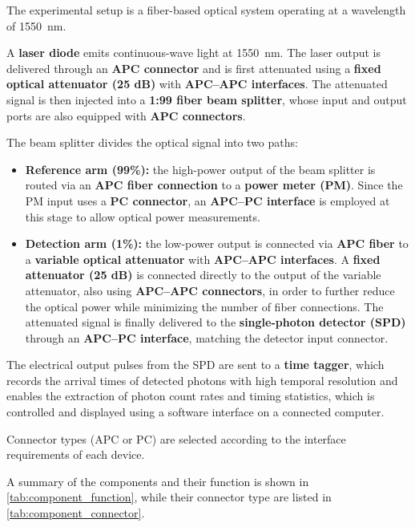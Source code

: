 The experimental setup is a fiber-based optical system operating at a
wavelength of \SI{1550}{\nano\meter}.

A \textbf{laser diode} emits continuous-wave light at
\SI{1550}{\nano\meter}. The laser output is delivered through an
\textbf{APC connector} and is first attenuated using a \textbf{fixed
optical attenuator (25 dB)} with \textbf{APC--APC interfaces}. The
attenuated signal is then injected into a \textbf{1:99 fiber beam
splitter}, whose input and output ports are also equipped with
\textbf{APC connectors}.

The beam splitter divides the optical signal into two paths:
\begin{itemize}
  \item \textbf{Reference arm (99\%):} the high-power output of the
    beam splitter is routed via an \textbf{APC fiber connection} to a
    \textbf{power meter (PM)}. Since the PM input uses a \textbf{PC
    connector}, an \textbf{APC--PC interface} is employed at this
    stage to allow optical power measurements.
  \item \textbf{Detection arm (1\%):} the low-power output is
    connected via \textbf{APC fiber} to a \textbf{variable optical
    attenuator} with \textbf{APC--APC interfaces}. A \textbf{fixed
    attenuator (25 dB)} is connected directly to the output of the
    variable attenuator, also using \textbf{APC--APC connectors}, in
    order to further reduce the optical power while minimizing the
    number of fiber connections. The attenuated signal is finally
    delivered to the \textbf{single-photon detector (SPD)} through an
    \textbf{APC--PC interface}, matching the detector input connector.
\end{itemize}

The electrical output pulses from the SPD are sent to a \textbf{time
tagger}, which records the arrival times of detected photons with
high temporal resolution and enables the extraction of photon count
rates and timing statistics, which is controlled and displayed using
a software interface on a connected computer.

Connector types (APC or PC) are selected according to the interface
requirements of each device.

A summary of the components and their function is shown in
\cref{tab:component_function},
while their connector type are listed in \cref{tab:component_connector}.

